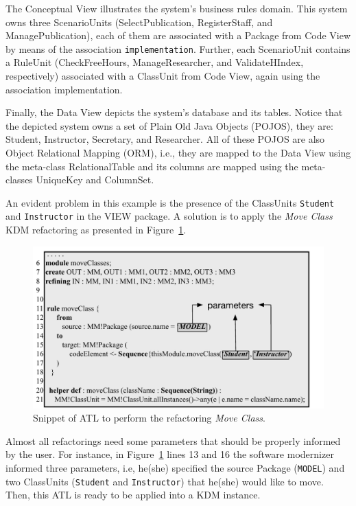 The Conceptual View illustrates the system's  business rules domain. This system owns three ScenarioUnits (SelectPublication, RegisterStaff, and ManagePublication), each of them are associated with a Package from Code View by means of the association \texttt{implementation}. Further, each ScenarioUnit contains a RuleUnit (CheckFreeHours, ManageResearcher, and ValidateHIndex, respectively) associated with a ClassUnit from Code View, again using the association implementation.

Finally, the Data View depicts the system's database and its tables. Notice that the depicted system owns a set of Plain Old Java Objects (POJOS), they are: Student, Instructor, Secretary, and Researcher. All of these POJOS are also Object Relational Mapping (ORM), i.e., they are mapped to the Data View using the meta-class RelationalTable and its columns are mapped using the meta-classes UniqueKey and ColumnSet.

An evident problem in this example is the presence of the ClassUnits \texttt{Student} and \texttt{Instructor} in the VIEW package. A solution is to apply the \textit{Move Class} KDM refactoring as presented in Figure~\ref{fig:ATLRefactoring}.

\begin{figure}[h]
	\centering
	\includegraphics[scale=0.516]{figuras/NovoMoveClassFormatted}
	\caption{Snippet of ATL to perform the refactoring \textit{Move Class}.}
	\label{fig:ATLRefactoring}
\end{figure}

Almost all refactorings need some parameters that should be properly informed by the user. For instance, in Figure~\ref{fig:ATLRefactoring} lines 13 and 16 the software modernizer informed three parameters, i.e, he(she) specified the source Package (\texttt{MODEL}) and two ClassUnits (\texttt{Student} and \texttt{Instructor}) that he(she) would like to move.
Then, this ATL is ready to be applied into a KDM instance.


